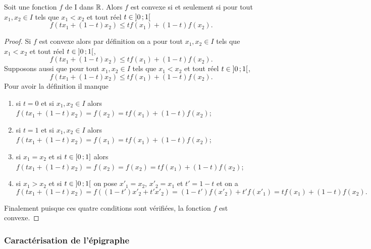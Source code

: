 \begin{theo}
  Soit une fonction \(f\) de I dans \(\mathbb{R}\). Alors \(f\) est convexe si et
  seulement si pour tout \(x_1, x_2 \in I\) tels que \(x_1 < x_2\) et tout réel
  \(t \in \left] 0 \, ; {} 1 \right[\)
  \begin{equation}
    f(tx_1+(1-t)x_2) \leqslant tf(x_1)+(1-t)f(x_2).
  \end{equation}
\end{theo}
\begin{proof}
  Si \(f\) est convexe alors par définition on a pour tout \(x_1, x_2 \in I\)
  tels que \(x_1 < x_2\) et tout réel \(t \in \left] 0 \, ; {} 1 \right[\),
  \begin{equation}
    f(tx_1+(1-t)x_2) \leqslant tf(x_1)+(1-t)f(x_2).
  \end{equation}
  Supposons aussi que pour tout \(x_1, x_2 \in I\) tels que \(x_1 < x_2\) et
  tout réel \(t \in \left] 0 \, ; {} 1 \right[\),
  \begin{equation}
    f(tx_1+(1-t)x_2) \leqslant tf(x_1)+(1-t)f(x_2).
  \end{equation}
  Pour avoir la définition il manque
  \begin{enumerate}
    \item si \(t=0\) et si \(x_1, x_2 \in I\) alors
      \(f(tx_1+(1-t)x_2)=f(x_2)=tf(x_1)+(1-t)f(x_2)\);
    \item si \(t=1\) et si \(x_1, x_2 \in I\) alors
      \(f(tx_1+(1-t)x_2)=f(x_1)=tf(x_1)+(1-t)f(x_2)\);
    \item si \(x_1=x_2\) et si \(t \in \left[ 0 \, ; {} 1 \right]\) alors
      \(f(tx_1+(1-t)x_2)=f(x_2)=f(x_2)=tf(x_1)+(1-t)f(x_2)\);
    \item si \(x_1>x_2\) et si \(t \in \left] 0 \, ; {} 1 \right[\) on pose \(x'_1=x_2\),
      \(x'_2=x_1\) et \(t'=1-t\) et on a
      \begin{equation}
        f(tx_1+(1-t)x_2) = f((1-t')x'_2+t'x'_2) = (1-t')f(x'_2) + t'f(x'_1) =
        tf(x_1)+(1-t)f(x_2).
      \end{equation}
  \end{enumerate}
  Finalement puisque ces quatre conditions sont vérifiées, la fonction \(f\) est
  convexe.
\end{proof}

\subsubsection{Caractérisation de l'épigraphe}

